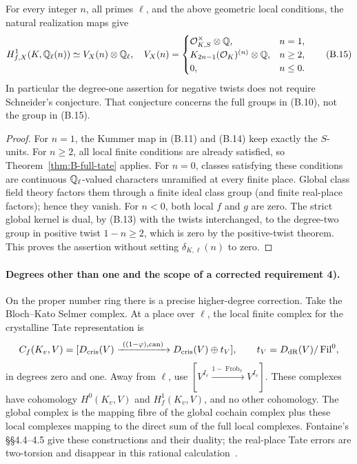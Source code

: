 \begin{proposition}
\label{prop:B-Hf-tate}
For every integer \(n\), all primes \(\ell\), and the above
geometric local conditions, the natural realization maps give
\[
 H^1_{f,X}(K,\mathbb Q_\ell(n))\simeq V_X(n)\otimes\mathbb Q_\ell,
\quad
 V_X(n)=
 \begin{cases}
 \mathcal O_{K,S}^\times\otimes\mathbb Q,&n=1,\\
 K_{2n-1}(\mathcal O_K)^{(n)}\otimes\mathbb Q,&n\ge2,\\
 0,&n\le0.
 \end{cases}\tag{B.15}
\]
In particular the degree-one assertion for negative twists does not
require Schneider's conjecture.  That conjecture concerns the full
groups in (B.10), not the group in (B.15).
\end{proposition}
\begin{proof}
For \(n=1\), the Kummer map in (B.11) and (B.14) keep exactly
the \(S\)-units.  For \(n\ge2\), all local finite conditions are
already satisfied, so Theorem~\ref{thm:B-full-tate} applies.  For
\(n=0\), classes satisfying these conditions are continuous
\(\mathbb Q_\ell\)-valued characters unramified at every finite place.
Global class field theory factors them through a finite ideal class
group (and finite real-place factors); hence they vanish.  For \(n<0\),
both local \(f\) and \(g\) are zero.  The strict global kernel is
dual, by (B.13) with the twists interchanged, to the degree-two group
in positive twist \(1-n\ge2\), which is zero by the positive-twist
theorem.  This proves the assertion without setting
\(\delta_{K,\ell}(n)\) to zero.
\end{proof}

\paragraph{Degrees other than one and the scope of a corrected requirement 4).}
On the proper number ring there is a precise higher-degree correction.
Take the Bloch--Kato Selmer complex.  At a place over \(\ell\),
the local finite complex for the crystalline Tate representation is
\[
 C_f(K_v,V)=
 [D_{\rm cris}(V)\xrightarrow{\ ((1-\varphi),\mathrm{can})\ }
 D_{\rm cris}(V)\oplus t_V],\qquad
 t_V=D_{\rm dR}(V)/\operatorname{Fil}^0,
\]
in degrees zero and one.  Away from \(\ell\), use
\([V^{I_v}\xrightarrow{1-\operatorname{Frob}_v}V^{I_v}]\).
These complexes have cohomology \(H^0(K_v,V)\) and
\(H^1_f(K_v,V)\), and no other cohomology.  The global complex is
the mapping fibre of the global cochain complex plus these local
complexes mapping to the direct sum of the full local complexes.
Fontaine's \S\S4.4--4.5 give these constructions and their duality;
the real-place Tate errors are two-torsion and disappear in this
rational calculation~\cite[pp.~214--216]{BFontaine1992}.

